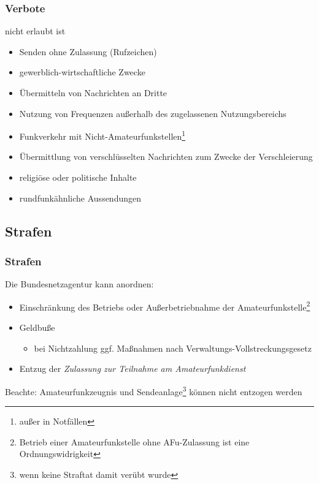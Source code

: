\begin{frame}
    \frametitle{Verbote}

    nicht erlaubt ist

    \begin{itemize}
        \item Senden ohne Zulassung (Rufzeichen)
        \item gewerblich-wirtschaftliche Zwecke
        \item Übermitteln von Nachrichten an Dritte
        \item Nutzung von Frequenzen außerhalb des zugelassenen Nutzungsbereichs
        \item Funkverkehr mit Nicht-Amateurfunkstellen\footnote{außer in Notfällen}
        \item Übermittlung von verschlüsselten Nachrichten zum Zwecke der Verschleierung
        \item religiöse oder politische Inhalte
        \item rundfunkähnliche Aussendungen
    \end{itemize}

\end{frame}

\subsection{Strafen}

\begin{frame}
    \frametitle{Strafen}

    Die Bundesnetzagentur kann anordnen:

    \begin{itemize}
        \item Einschränkung des Betriebs oder Außerbetriebnahme der
              Amateurfunkstelle\footnote{Betrieb einer Amateurfunkstelle ohne
              AFu-Zulassung ist eine Ordnungswidrigkeit}
        \item Geldbuße
        \begin{itemize}
            \item bei Nichtzahlung ggf. Maßnahmen nach Verwaltungs-Vollstreckungsgesetz
        \end{itemize}
        \item Entzug der \emph{Zulassung zur Teilnahme am Amateurfunkdienst}
    \end{itemize}

    \vspace{1em}

    Beachte: Amateurfunkzeugnis und Sendeanlage\footnote{wenn keine Straftat
    damit verübt wurde} können nicht entzogen werden

\end{frame}

